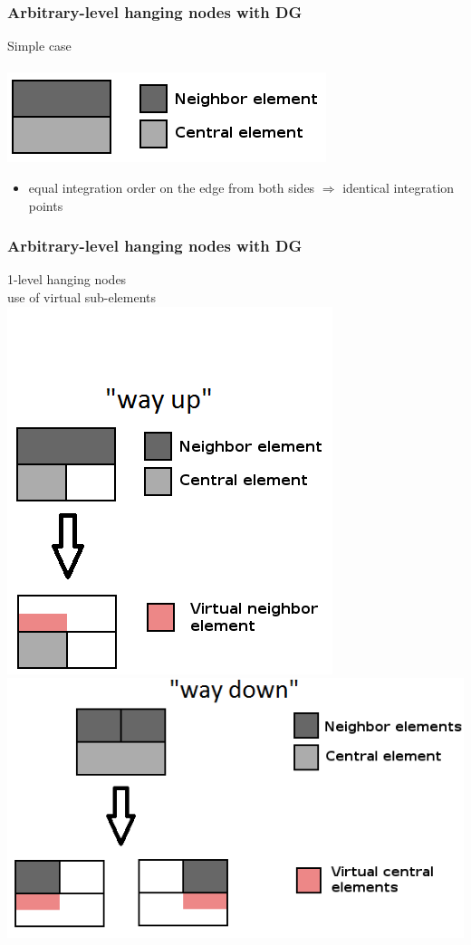 \documentclass{beamer}
\begin{document}
\begin{frame}
\frametitle{Arbitrary-level hanging nodes with DG}
\begin{center}
Simple case\\ \ \\
\includegraphics[width=0.7\textheight]{no_trans.png}
\end{center}
\begin{itemize}
\item equal integration order on the edge from both sides $\Rightarrow$ identical integration points
\end{itemize}
\end{frame}
\begin{frame}
\frametitle{Arbitrary-level hanging nodes with DG}
\begin{center}
1-level hanging nodes\\
use of virtual sub-elements\\
\includegraphics[width=0.5\textheight]{way_up1.png}
\hspace{4mm}
\includegraphics[width=0.75\textheight]{way_down1.png}
\end{center}
\end{frame}
\end{document}
